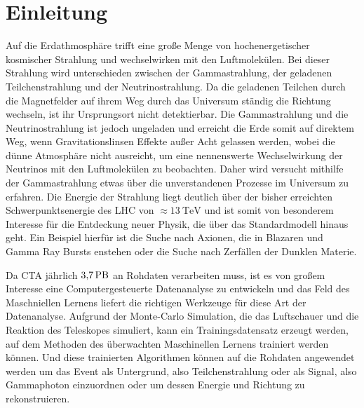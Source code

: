 \chapter{Einleitung}

Auf die Erdathmosphäre trifft eine große Menge von hochenergetischer kosmischer Strahlung und wechselwirken mit den Luftmolekülen.
Bei dieser Strahlung wird unterschieden zwischen der Gammastrahlung, der geladenen Teilchenstrahlung und der Neutrinostrahlung.
Da die geladenen Teilchen durch die Magnetfelder auf ihrem Weg durch das Universum ständig die Richtung wechseln, ist ihr Ursprungsort nicht
detektierbar.
Die Gammastrahlung und die Neutrinostrahlung ist jedoch ungeladen und erreicht die Erde somit auf direktem Weg, wenn Gravitationslinsen Effekte
außer Acht gelassen werden, wobei die dünne Atmosphäre nicht ausreicht, um eine nennenswerte Wechselwirkung der Neutrinos mit den Luftmolekülen zu
beobachten.
Daher wird versucht mithilfe der Gammastrahlung etwas über die unverstandenen Prozesse im Universum zu erfahren.
Die Energie der Strahlung liegt deutlich über der bisher erreichten Schwerpunktsenergie des LHC von $\approx\SI{13}{\tera\eV}$\cite{LHC} und ist somit
von besonderem Interesse für die Entdeckung neuer Physik, die über das Standardmodell hinaus geht.
Ein Beispiel hierfür ist die Suche nach Axionen, die in Blazaren und Gamma Ray Bursts enstehen oder die Suche nach Zerfällen der Dunklen Materie.

Da CTA jährlich $\SI{3.7}{\peta\byte}$\cite{Rohdaten} an Rohdaten verarbeiten muss, ist es von großem Interesse eine Computergesteuerte Datenanalyse zu
entwickeln und das Feld des Maschniellen Lernens liefert die richtigen Werkzeuge für diese Art der Datenanalyse.
Aufgrund der Monte-Carlo Simulation, die das Luftschauer und die Reaktion des Teleskopes simuliert, kann ein Trainingsdatensatz erzeugt werden, auf dem
Methoden des überwachten Maschinellen Lernens trainiert werden können.
Und diese trainierten Algorithmen können auf die Rohdaten angewendet werden um das Event als Untergrund, also Teilchenstrahlung oder als
Signal, also Gammaphoton einzuordnen oder um dessen Energie und Richtung zu rekonstruieren.

